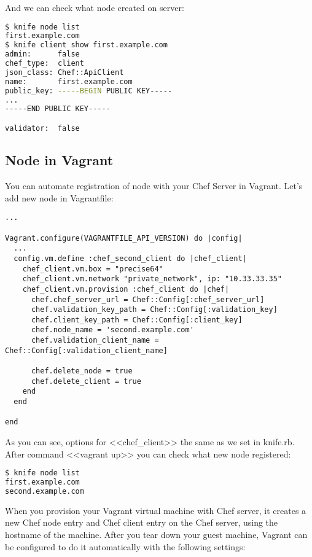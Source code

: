 And we can check what node created on server:

\begin{lstlisting}[language=Bash,label=lst:my-server-cloud-node6]
$ knife node list
first.example.com
$ knife client show first.example.com
admin:      false
chef_type:  client
json_class: Chef::ApiClient
name:       first.example.com
public_key: -----BEGIN PUBLIC KEY-----
...
-----END PUBLIC KEY-----

validator:  false
\end{lstlisting}

\subsection{Node in Vagrant}

You can automate registration of node with your Chef Server in Vagrant. Let's add new node in Vagrantfile:

\begin{lstlisting}[label=lst:my-server-cloud-node7,title=my-server-cloud/Vagrantfile]
...

Vagrant.configure(VAGRANTFILE_API_VERSION) do |config|
  ...
  config.vm.define :chef_second_client do |chef_client|
    chef_client.vm.box = "precise64"
    chef_client.vm.network "private_network", ip: "10.33.33.35"
    chef_client.vm.provision :chef_client do |chef|
      chef.chef_server_url = Chef::Config[:chef_server_url]
      chef.validation_key_path = Chef::Config[:validation_key]
      chef.client_key_path = Chef::Config[:client_key]
      chef.node_name = 'second.example.com'
      chef.validation_client_name = Chef::Config[:validation_client_name]

      chef.delete_node = true
      chef.delete_client = true
    end
  end

end
\end{lstlisting}

As you can see, options for <<chef\_client>> the same as we set in knife.rb. After command <<vagrant up>> you can check what new node registered:

\begin{lstlisting}[language=Bash,label=lst:my-server-cloud-node10]
$ knife node list
first.example.com
second.example.com
\end{lstlisting}

When you provision your Vagrant virtual machine with Chef server, it creates a new Chef node entry and Chef client entry on the Chef server, using the hostname of the machine. After you tear down your guest machine, Vagrant can be configured to do it automatically with the following settings:

